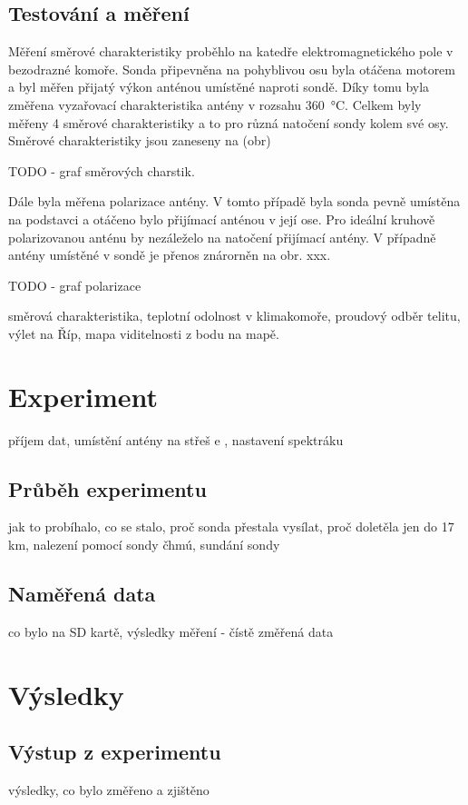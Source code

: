 \documentclass[twoside]{ctuthesis}
\theoremstyle{plain}
\theoremstyle{definition}
\theoremstyle{note}
\begin{document}
	\section{Testování a měření}
	Měření směrové charakteristiky proběhlo na katedře elektromagnetického pole v bezodrazné komoře. Sonda připevněna na pohyblivou osu byla otáčena motorem a byl měřen přijatý výkon anténou umístěné naproti sondě. Díky tomu byla změřena vyzařovací charakteristika antény v rozsahu 360~°C. Celkem byly měřeny 4 směrové charakteristiky a to pro různá natočení sondy kolem své osy. Směrové charakteristiky jsou zaneseny na (obr)

	TODO - graf směrových charstik.

	Dále byla měřena polarizace antény. V tomto případě byla sonda pevně umístěna na podstavci a otáčeno bylo přijímací anténou v její ose. Pro ideální kruhově polarizovanou anténu by nezáleželo na natočení přijímací antény. V případně antény umístěné v sondě je přenos znárorněn na obr. xxx.

	TODO - graf polarizace


	směrová charakteristika, teplotní odolnost v klimakomoře, proudový odběr telitu, výlet na Říp, mapa viditelnosti z bodu na mapě. 




\chapter{Experiment}
příjem dat, umístění antény na střeš e , nastavení spektráku
	\section{Průběh experimentu}
	jak to probíhalo, co se stalo, proč sonda přestala vysílat, proč doletěla jen do 17 km, nalezení pomocí sondy čhmú, sundání sondy

	\section{Naměřená data}
	co bylo na SD kartě, výsledky měření - čístě změřená data



\chapter{Výsledky}
	\section{Výstup z experimentu}
	výsledky, co bylo změřeno a zjištěno
\end{document}
